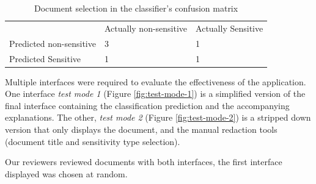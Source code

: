 \documentclass{l4proj}
\begin{document}
\begin{table}[H]
    \begin{tabular}{l ll}
                                & Actually non-sensitive & Actually Sensitive \\ 
        Predicted non-sensitive & 3                      & 1                  \\
        Predicted Sensitive     & 1                      & 1                 
    \end{tabular}
    \caption{Document selection in the classifier's confusion matrix}
    \label{tab:confusion-matrix-selection}
\end{table}


Multiple interfaces were required to evaluate the effectiveness of the application.
One interface \textit{test mode 1} (Figure \ref{fig:test-mode-1}) is a simplified version of the final interface containing the classification prediction and the accompanying explanations.
The other, \textit{test mode 2} (Figure \ref{fig:test-mode-2}) is a stripped down version that only displays the document, and the manual redaction tools (document title and sensitivity type selection).

Our reviewers reviewed documents with both interfaces, the first interface displayed was chosen at random.
\end{document}
